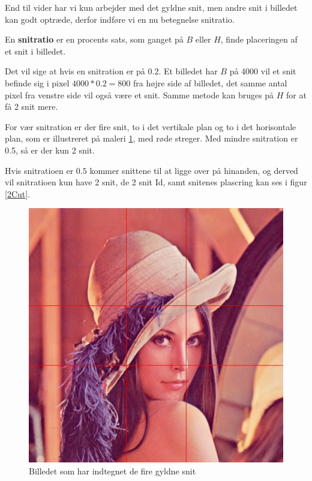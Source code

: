 End til vider har vi kun arbejder med det gyldne snit, men andre snit i
billedet kan godt optræde, derfor indføre vi en nu betegnelse
snitratio.

\begin{definition}
	En \textbf{snitratio} er en procents sats, som ganget på $B$ eller
	$H$, finde placeringen af et snit i billedet.
\end{definition}

Det vil sige at hvis en snitration er på $0.2$. Et billedet har $B$ på
4000 vil et snit befinde sig i pixel $4000*0.2 = 800$ fra højre side af
billedet, det samme antal pixel fra venstre side vil også være et snit.
Samme metode kan bruges på $H$ for at få 2 snit mere. 

\begin{definition}
	For vær snitration er der fire snit, to i det vertikale plan og to i
	det horisontale plan, som er illustreret på maleri \ref{lenasnit2},
	med røde streger. Med mindre snitration er 0.5, så er der kun 2 snit.
\end{definition}

Hvis snitratioen er $0.5$ kommer snittene til at ligge over på hinanden,
og derved vil snitratioen kun have 2 snit, de 2 snit Id, samt snitenes
plascring kan ses i figur \ref{2Cut}.

\begin{figure}[h]
	\begin{center}
		\includegraphics[scale=0.42,angle=0]{afsnit/vores_implementation/billeder/naiv_algoritme/Lenagolden}
	\end{center}
	\caption[]{Billedet som har indtegnet de fire gyldne snit}
	\label{lenasnit2}
\end{figure}

